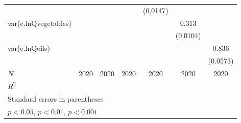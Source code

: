 {\begin{tabular}{l*{6}{c}}
            &                     &                     &                     &    (0.0147)         &                     &                     \\
[1em]
var(e.lnQvegetables)&                     &                     &                     &                     &       0.313\sym{***}&                     \\
            &                     &                     &                     &                     &    (0.0104)         &                     \\
[1em]
var(e.lnQoils)&                     &                     &                     &                     &                     &       0.836\sym{***}\\
            &                     &                     &                     &                     &                     &    (0.0573)         \\
\hline
\(N\)       &        2020         &        2020         &        2020         &        2020         &        2020         &        2020         \\
\(R^{2}\)   &                     &                     &                     &                     &                     &                     \\
\hline\hline
\multicolumn{7}{l}{\footnotesize Standard errors in parentheses}\\
\multicolumn{7}{l}{\footnotesize \sym{*} \(p<0.05\), \sym{**} \(p<0.01\), \sym{***} \(p<0.001\)}\\
\end{tabular}
}
